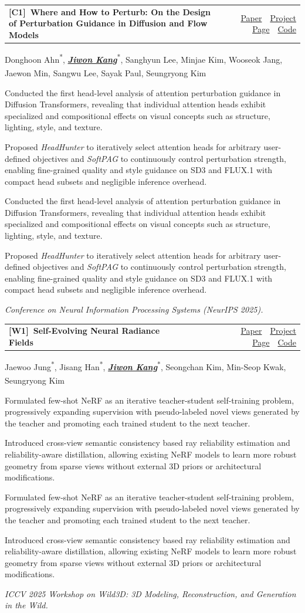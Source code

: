 \documentclass[11pt,letterpaper]{article}
\makeatletter
\newcommand{\me}[1]{\textbf{\textit{\uline{#1}}}}   %
\newcommand{\eqc}{\textsuperscript{*}}              %
\newcommand{\corr}{\textsuperscript{\dag}}          %
\newcommand{\pubgroup}[1]{%
  \vspace{2pt}{\Large\bfseries #1}\par
  \nobreak\vspace{2pt}\nobreak
}
\newcommand{\publinks}[3]{%
  \small\color{linkblue}%
  \href{#1}{Paper}~\textbar~\href{#2}{Project Page}~\textbar~\href{#3}{Code}%
}
\newcommand{\pubitem}[6]{%
  \begingroup
  \setlength{\parfillskip}{0pt}%
  \noindent\begin{minipage}{\linewidth}%
  \setlength{\tabcolsep}{0pt}%
  \noindent
  \begin{tabularx}{\linewidth}{@{}>{\RaggedRight\arraybackslash}X @{\hspace{1.5em}} r@{}}
    \textbf{#1\ #2} & #3
  \end{tabularx}\par
  #4\par
  \def\pub@desc{#6}%
  \ifx\pub@desc\@empty\else
    \begin{cvbullets}#6\end{cvbullets}%
  \fi
  \textit{#5}\par
  \end{minipage}%
  \par
  \endgroup
}
\makeatother
\begin{document}
\pubitem{[C1]}
  {\label{HeadHunter}Where and How to Perturb: On the Design of Perturbation Guidance in Diffusion and Flow Models}
  {\publinks{https://arxiv.org/abs/2506.10978}{https://cvlab-kaist.github.io/HeadHunter/}{https://github.com/cvlab-kaist/HeadHunter}}
  {Donghoon Ahn\eqc, \me{Jiwon Kang}\eqc, Sanghyun Lee, Minjae Kim, Wooseok Jang, Jaewon Min, Sangwu Lee, Sayak Paul, Seungryong Kim\corr}
  {Conference on Neural Information Processing Systems (NeurIPS 2025).}
  {\item Conducted the first head-level analysis of attention perturbation guidance in Diffusion Transformers, revealing that individual attention heads exhibit specialized and compositional effects on visual concepts such as structure, lighting, style, and texture. \item Proposed \textit{HeadHunter} to iteratively select attention heads for arbitrary user-defined objectives and \textit{SoftPAG} to continuously control perturbation strength, enabling fine-grained quality and style guidance on SD3 and FLUX.1 with compact head subsets and negligible inference overhead.}

\pubgroup{Workshop}

\pubitem{[W1]}
  {\label{senerf}Self-Evolving Neural Radiance Fields}
  {\publinks{https://arxiv.org/abs/2312.01003}{https://cvlab-kaist.github.io/SE-NeRF/}{https://github.com/cvlab-kaist/SE-NeRF}}
  {Jaewoo Jung\eqc, Jisang Han\eqc, \me{Jiwon Kang}\eqc, Seongchan Kim, Min-Seop Kwak, Seungryong Kim\corr}
  {ICCV 2025 Workshop on Wild3D: 3D Modeling, Reconstruction, and Generation in the Wild.}
  {\item Formulated few-shot NeRF as an iterative teacher-student self-training problem, progressively expanding supervision with pseudo-labeled novel views generated by the teacher and promoting each trained student to the next teacher. \item Introduced cross-view semantic consistency based ray reliability estimation and reliability-aware distillation, allowing existing NeRF models to learn more robust geometry from sparse views without external 3D priors or architectural modifications.}

\pubgroup{Preprints \& Under Review}
\end{document}
